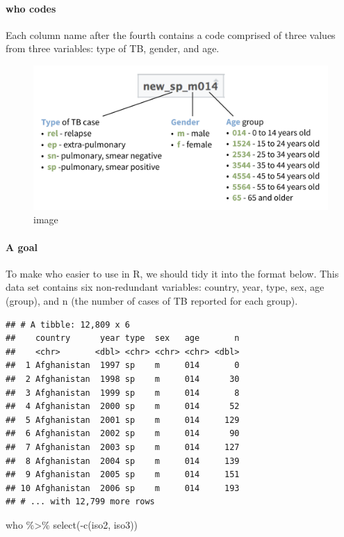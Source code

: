 \documentclass[
]{article}
\newenvironment{Shaded}{\begin{snugshade}}{\end{snugshade}}
\newcommand{\FunctionTok}[1]{\textcolor[rgb]{0.00,0.00,0.00}{#1}}
\newcommand{\NormalTok}[1]{#1}
\newcommand{\SpecialCharTok}[1]{\textcolor[rgb]{0.00,0.00,0.00}{#1}}
\begin{document}
\hypertarget{who-codes}{%
\paragraph{who codes}\label{who-codes}}

Each column name after the fourth contains a code comprised of three
values from three variables: type of TB, gender, and age.

\begin{figure}
\centering
\includegraphics{data/codes.png}
\caption{image}
\end{figure}

\hypertarget{a-goal-1}{%
\paragraph{A goal}\label{a-goal-1}}

To make who easier to use in R, we should tidy it into the format below.
This data set contains six non-redundant variables: country, year, type,
sex, age (group), and n (the number of cases of TB reported for each
group).

\begin{verbatim}
## # A tibble: 12,809 x 6
##    country      year type  sex   age       n
##    <chr>       <dbl> <chr> <chr> <chr> <dbl>
##  1 Afghanistan  1997 sp    m     014       0
##  2 Afghanistan  1998 sp    m     014      30
##  3 Afghanistan  1999 sp    m     014       8
##  4 Afghanistan  2000 sp    m     014      52
##  5 Afghanistan  2001 sp    m     014     129
##  6 Afghanistan  2002 sp    m     014      90
##  7 Afghanistan  2003 sp    m     014     127
##  8 Afghanistan  2004 sp    m     014     139
##  9 Afghanistan  2005 sp    m     014     151
## 10 Afghanistan  2006 sp    m     014     193
## # ... with 12,799 more rows
\end{verbatim}

\begin{Shaded}
\begin{Highlighting}[]
\NormalTok{who }\SpecialCharTok{\%\textgreater{}\%} \FunctionTok{select}\NormalTok{(}\SpecialCharTok{{-}}\FunctionTok{c}\NormalTok{(iso2, iso3))}
\end{Highlighting}
\end{Shaded}
\end{document}
